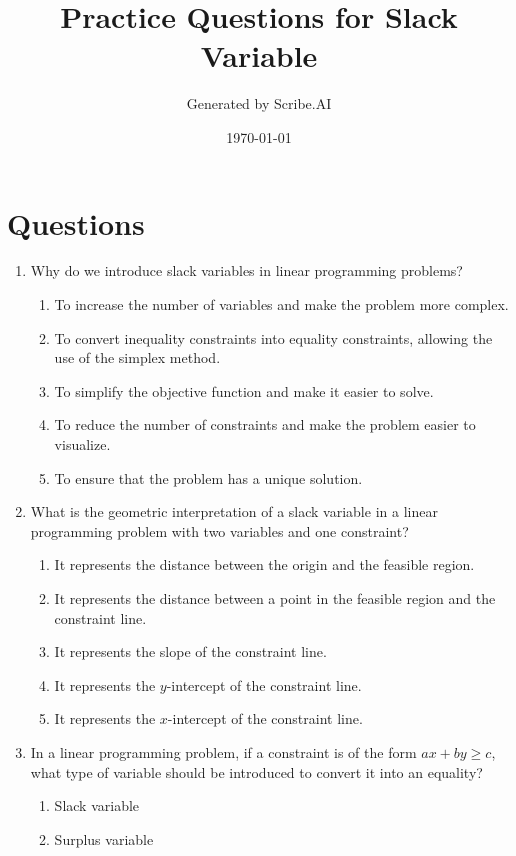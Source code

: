 \documentclass{article}%
\title{Practice Questions for Slack Variable}%
\author{Generated by Scribe.AI}%
\date{\today}%
\begin{document}
%
\normalsize%
\maketitle%
\section{Questions}%
\label{sec:Questions}%
\begin{enumerate}%
\item Why do we introduce slack variables in linear programming problems?%
\begin{enumerate}%
\item To increase the number of variables and make the problem more complex.%
\item To convert inequality constraints into equality constraints, allowing the use of the simplex method.%
\item To simplify the objective function and make it easier to solve.%
\item To reduce the number of constraints and make the problem easier to visualize.%
\item To ensure that the problem has a unique solution.%
\end{enumerate}%
\vspace{1em}%
\item What is the geometric interpretation of a slack variable in a linear programming problem with two variables and one constraint?%
\begin{enumerate}%
\item It represents the distance between the origin and the feasible region.%
\item It represents the distance between a point in the feasible region and the constraint line.%
\item It represents the slope of the constraint line.%
\item It represents the $y$-intercept of the constraint line.%
\item It represents the $x$-intercept of the constraint line.%
\end{enumerate}%
\vspace{1em}%
\item In a linear programming problem, if a constraint is of the form $ax + by \ge c$, what type of variable should be introduced to convert it into an equality?%
\begin{enumerate}%
\item Slack variable%
\item Surplus variable%

\end{enumerate}
\end{enumerate}
\end{document}
